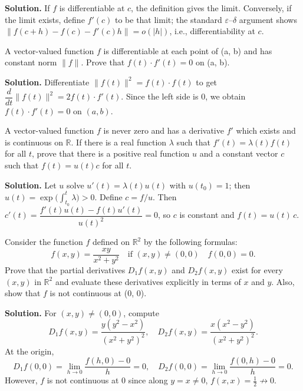 \noindent\textbf{Solution.}
If $f$ is differentiable at $c$, the definition gives the limit. Conversely, if the limit exists, define $f'(c)$ to be that limit; the standard $\varepsilon$–$\delta$ argument shows $\|f(c+h)-f(c)-f'(c)h\|=o(|h|)$, i.e., differentiability at $c$.

\begin{problembox}
A vector-valued function \( f \) is differentiable at each point of (a, b) and has constant norm \( \|f\| \). Prove that \( f(t) \cdot f'(t) = 0 \) on (a, b).
\end{problembox}

\noindent\textbf{Solution.}
Differentiate $\|f(t)\|^2=f(t)\cdot f(t)$ to get $\dfrac{d}{dt}\|f(t)\|^2=2 f(t)\cdot f'(t)$. Since the left side is $0$, we obtain $f(t)\cdot f'(t)=0$ on $(a,b)$.

\begin{problembox}
A vector-valued function \( f \) is never zero and has a derivative \( f' \) which exists and is continuous on \( \mathbb{R} \). If there is a real function \( \lambda \) such that \( f'(t) = \lambda(t)f(t) \) for all \( t \), prove that there is a positive real function \( u \) and a constant vector \( c \) such that \( f(t) = u(t)c \) for all \( t \).
\end{problembox}

\noindent\textbf{Solution.}
Let $u$ solve $u'(t)=\lambda(t)u(t)$ with $u(t_0)=1$; then $u(t)=\exp\big(\int_{t_0}^t\!\lambda\big)>0$. Define $c=f/u$. Then $c'(t)=\dfrac{f'(t)u(t)-f(t)u'(t)}{u(t)^2}=0$, so $c$ is constant and $f(t)=u(t)\,c$.

\begin{problembox}
Consider the function \( f \) defined on \( \mathbb{R}^2 \) by the following formulas:
\[ f(x, y) = \frac{xy}{x^2 + y^2} \quad \text{if } (x, y) \neq (0, 0) \quad f(0, 0) = 0. \]
Prove that the partial derivatives \( D_1 f(x, y) \) and \( D_2 f(x, y) \) exist for every \( (x, y) \) in \( \mathbb{R}^2 \) and evaluate these derivatives explicitly in terms of \( x \) and \( y \). Also, show that \( f \) is not continuous at (0, 0).
\end{problembox}

\noindent\textbf{Solution.}
For $(x,y)\ne(0,0)$, compute
\[D_1f(x,y)=\frac{y(y^2-x^2)}{(x^2+y^2)^2},\quad D_2f(x,y)=\frac{x(x^2-y^2)}{(x^2+y^2)^2}.\]
At the origin,
\[D_1f(0,0)=\lim_{h\to 0}\frac{f(h,0)-0}{h}=0,\quad D_2f(0,0)=\lim_{h\to 0}\frac{f(0,h)-0}{h}=0.\]
However, $f$ is not continuous at $0$ since along $y=x\ne 0$, $f(x,x)=\tfrac12\not\to 0$.

